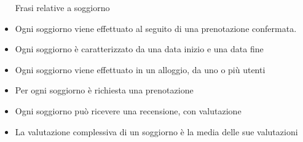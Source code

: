 \documentclass[letterpaper]{report}
\begin{document}
\begin{itemize} Frasi relative a soggiorno
\item Ogni soggiorno viene effettuato al seguito di una prenotazione confermata.
\item Ogni soggiorno è caratterizzato da una data inizio e una data fine
\item Ogni soggiorno viene effettuato in un alloggio, da uno o più utenti
\item Per ogni soggiorno è richiesta una prenotazione
\item Ogni soggiorno può ricevere una recensione, con valutazione
\item La valutazione complessiva di un soggiorno è la media delle sue valutazioni

\end{itemize}
\end{document}

